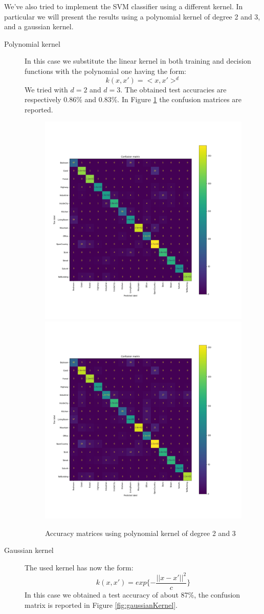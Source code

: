 \documentclass[12pt, a4paper]{report}
\begin{document}
We've also tried to implement the SVM classifier using a different kernel. In particular we will present the results using a polynomial kernel of degree 2 and 3, and a gaussian kernel. 
\begin{description}
	\item[Polynomial kernel] In this case we substitute the linear kernel in both training and decision functions with the polynomial one having the form:
	$$
	k(x,x') = <x,x'>^d
	$$
	We tried with $d=2$ and $d=3$. The obtained test accuracies are respectively 0.86\% and 0.83\%. In Figure \ref{fig:poly23} the confusion matrices are reported.
	\begin{figure}[h!]
		\centering
		{\includegraphics[width=.49\textwidth]{img/polynomial2.png}}
		{\includegraphics[width=.49\textwidth]{img/polynomial3.png}}
		\caption{Accuracy matrices using polynomial kernel of degree 2 and 3}
		\label{fig:poly23}
	\end{figure}
	\item[Gaussian kernel] The used kernel has now the form:
	$$
	k(x,x') = exp\{-\frac{||x-x'||^2}{c}\}
	$$
	In this case we obtained a test accuracy of about 87\%, the confusion matrix is reported in Figure \ref{fig:gaussianKernel}.
	

\end{description}
\end{document}
